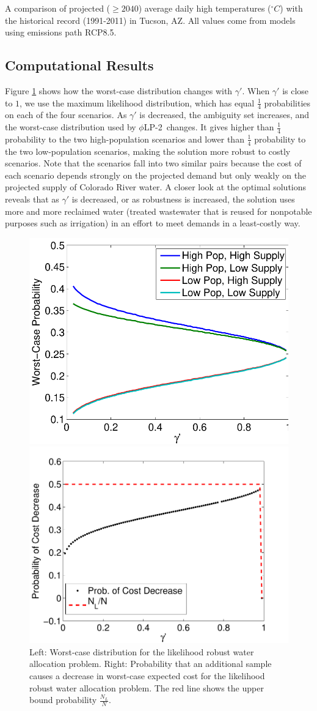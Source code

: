 \documentclass[opre,nonblindrev]{informs3} %
\newcommand{\plp}{$\phi$LP-2}
\begin{document}
\begin{table}
	\TABLE
	{
		A comparison of projected ($\geq 2040$) average daily high temperatures ($^\circ C$) with the historical record (1991-2011) in Tucson, AZ.
		All values come from models using emissions path RCP8.5.
		\label{tb:model_comparison_temperature}
	}
	{}
	{}
\end{table}

\subsection{Computational Results}

Figure \ref{fig:water_worst_case} shows how the worst-case distribution changes with $\gamma'$.
When $\gamma'$ is close to $1$, we use the maximum likelihood distribution, which has equal $\tfrac{1}{4}$ probabilities on each of the four scenarios.
As $\gamma'$ is decreased, the ambiguity set increases, and the worst-case distribution used by \plp\ changes.
It gives higher than $\tfrac{1}{4}$ probability to the two high-population scenarios and lower than $\tfrac{1}{4}$ probability to the two low-population scenarios, making the solution more robust to costly scenarios.
Note that the scenarios fall into two similar pairs because the cost of each scenario depends strongly on the projected demand but only weakly on the projected supply of Colorado River water.
A closer look at the optimal solutions reveals that as $\gamma'$ is decreased, or as robustness is increased, the solution uses more and more reclaimed water (treated wastewater that is reused for nonpotable purposes such as irrigation) in an effort to meet demands in a least-costly way.

\begin{figure}
	\FIGURE
	{%
		\includegraphics*[width=.45\textwidth]{images/worst_case_probability}%
		\includegraphics*[width=.45\textwidth]{images/water_prob_decrease}%
	}
	{
		Left: Worst-case distribution for the likelihood robust water allocation problem.
		Right: Probability that an additional sample causes a decrease in worst-case expected cost for the likelihood robust water allocation problem.
		The red line shows the upper bound probability $\tfrac{N_L}{N}$.
		\label{fig:water_worst_case}
	}
	{}
\end{figure}
\end{document}
